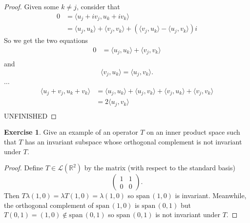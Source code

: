 \documentclass{article}
\theoremstyle{definition}
\newtheorem{ex}{Exercise}
\begin{document}
\begin{proof}
	Given some $k \neq j$, consider that \begin{align*}
		0 & = \langle u_j + iv_j, u_k + iv_k \rangle                                                                       \\
		  & = \langle u_j, u_k \rangle + \langle v_j, v_k \rangle + (\langle v_j, u_k \rangle - \langle u_j, v_k \rangle)i
	\end{align*}
	So we get the two equations \begin{align*}
		0 & = \langle u_j, u_k \rangle + \langle v_j, v_k \rangle \\
	\end{align*} and \begin{equation*}
		\langle v_j, u_k \rangle = \langle u_j, v_k \rangle.
	\end{equation*}
	$\dots$
	\begin{align*}
		\langle u_j + v_j, u_k + v_k \rangle & = \langle u_j, u_k \rangle + \langle u_j, v_k \rangle + \langle v_j, u_k \rangle + \langle v_j, v_k \rangle \\
		                                     & = 2 \langle u_j, v_k \rangle                                                                                \\
	\end{align*}
  UNFINISHED
\end{proof}

\begin{ex}
	Give an example of an operator $T$ on an inner product space such that $T$ has an invariant subspace whose orthogonal complement is not invariant under $T$.
\end{ex}
\begin{proof}
	Define $T \in \mathcal{L}(\mathbb{R}^2)$ by the matrix (with respect to the standard basis) \begin{equation*}
		\begin{pmatrix}
			1 & 1 \\
			0 & 0
		\end{pmatrix}.
	\end{equation*}
	Then $T \lambda (1, 0) = \lambda T(1, 0) = \lambda (1, 0)$ so $\mathrm{span}\,(1, 0)$ is invariant.
  Meanwhile, the orthogonal complement of $\mathrm{span}\,(1, 0)$ is $\mathrm{span}\,(0, 1)$ but $T (0, 1) = (1, 0) \notin \mathrm{span}\,(0, 1)$ so $\mathrm{span}\,(0, 1)$ is not invariant under $T$.
\end{proof}
\end{document}
